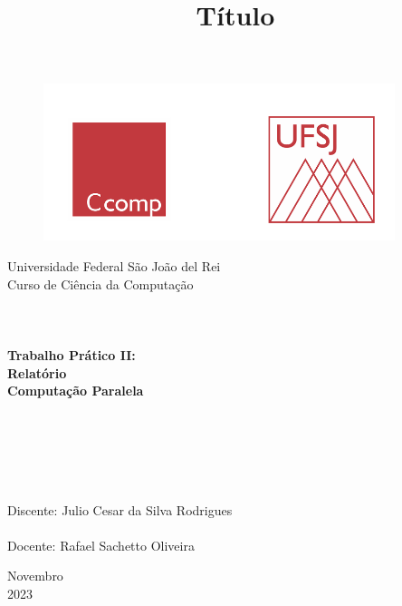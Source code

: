 \documentclass[a4paper, 12pt]{article}
\begin{document}

\begin{titlepage}
	\begin{center}
	
	\begin{figure}[ht]
    \centering
    \includegraphics[width=.44\textwidth]{Images/LogoUFSJ.PNG}
    \label{fig:Capturar.PNG}
    \end{figure}

    	\Huge{Universidade Federal São João del Rei}\\
		\Large{Curso de Ciência da Computação}\\ 

        \vspace{90pt}
        \textbf{\LARGE{
        \\
        \\
        \\
        Trabalho Prático II:\\
        Relatório\\
        \vspace{0.5cm}
        \Large{Computação Paralela}
        \\
        \\
        \\
        }}
        
		\title{{\large{Título}}}
		\vspace{1.5cm}
	\end{center}
	    
    \begin{flushleft}
		\begin{tabbing}
		\\
		\\
		\\	
		\large{Discente: Julio Cesar da Silva Rodrigues}\\
	    \\
		\large{Docente: Rafael Sachetto Oliveira}\\
	    \end{tabbing}
    \end{flushleft}
	\vspace{1cm}
	
	\begin{center}
		\vspace{\fill}
			Novembro\\
		    2023
	\end{center}
\end{titlepage}
\end{document}
